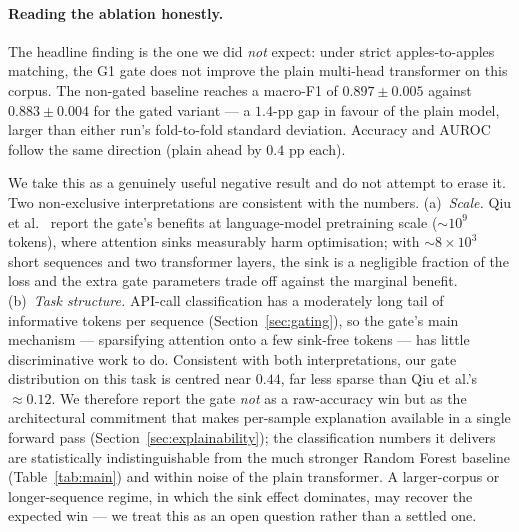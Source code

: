 \paragraph{Reading the ablation honestly.}
The headline finding is the one we did \emph{not} expect: under
strict apples-to-apples matching, the G1 gate does not improve
the plain multi-head transformer on this corpus. The non-gated
baseline reaches a macro-F1 of $0.897 \pm 0.005$ against
$0.883 \pm 0.004$ for the gated variant --- a $1.4$-pp gap in
favour of the plain model, larger than either run's fold-to-fold
standard deviation. Accuracy and AUROC follow the same
direction (plain ahead by $0.4$ pp each).

We take this as a genuinely useful negative result and do not
attempt to erase it. Two non-exclusive interpretations are
consistent with the numbers. (a)~\emph{Scale.} Qiu et
al.~\cite{qiu2025gated} report the gate's benefits at
language-model pretraining scale ($\sim 10^9$ tokens), where
attention sinks measurably harm optimisation; with
${\sim} 8 \times 10^3$ short sequences and two transformer
layers, the sink is a negligible fraction of the loss and the
extra gate parameters trade off against the marginal benefit.
(b)~\emph{Task structure.} API-call classification has a
moderately long tail of informative tokens per sequence
(Section~\ref{sec:gating}), so the gate's main mechanism ---
sparsifying attention onto a few sink-free tokens --- has
little discriminative work to do. Consistent with both
interpretations, our gate distribution on this task is
centred near $0.44$, far less sparse than Qiu et al.'s
$\approx 0.12$. We therefore report the gate \emph{not} as a
raw-accuracy win but as the architectural commitment that makes
per-sample explanation available in a single forward pass
(Section~\ref{sec:explainability}); the classification numbers
it delivers are statistically indistinguishable from the much
stronger Random Forest baseline (Table~\ref{tab:main}) and
within noise of the plain transformer. A larger-corpus or
longer-sequence regime, in which the sink effect dominates, may
recover the expected win --- we treat this as an open question
rather than a settled one.
